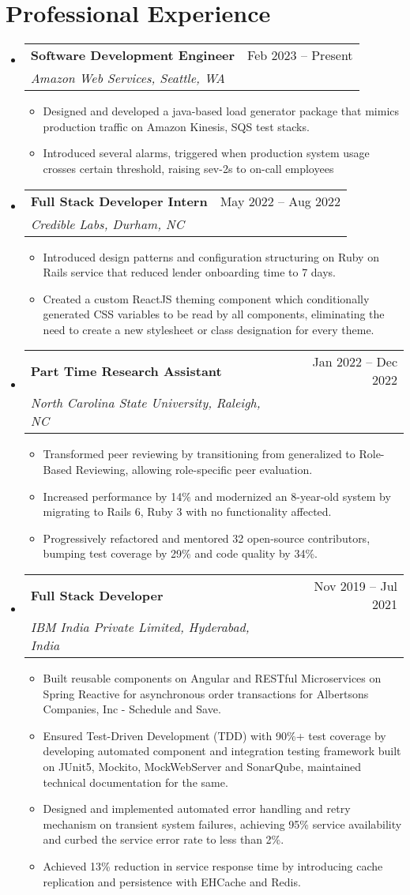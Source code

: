 \documentclass[a4paper,10pt]{article}
\makeatletter
\newcommand{\resumeItem}[1]{
  \item\small{#1}
}
\newcommand{\resumeItemListStart}{\begin{itemize}[rightmargin=0.11in]}
\newcommand{\resumeItemListEnd}{\end{itemize}}
\newcommand{\resumeQuadHeading}[4]{
  \item
  \begin{tabular*}{0.96\textwidth}[t]{l@{\extracolsep{\fill}}r}
    \textbf{#1} & #2 \\
    \textit{\small#3} & \textit{\small #4} \\
  \end{tabular*}
}
\newcommand{\resumeHeadingListStart}{
  \begin{itemize}[leftmargin=0.15in, label={}]
}
\newcommand{\resumeHeadingListEnd}{\end{itemize}}
\makeatother
\begin{document}
\section{Professional Experience}
\resumeHeadingListStart{}

  \resumeQuadHeading{Software Development Engineer}{Feb 2023 -- Present}
  {Amazon Web Services, Seattle, WA}{}
    \resumeItemListStart{}
      \resumeItem{Designed and developed a java-based load generator package that mimics production traffic on Amazon Kinesis, SQS test stacks.}
      \resumeItem{Introduced several alarms, triggered when production system usage crosses certain threshold, raising sev-2s to on-call employees}
    \resumeItemListEnd{}
  
    \resumeQuadHeading{Full Stack Developer Intern}{May 2022 -- Aug 2022}
    {Credible Labs, Durham, NC}{}
      \resumeItemListStart{}
        \resumeItem{Introduced design patterns and configuration structuring on Ruby on Rails service that reduced lender onboarding time to 7 days.}
        \resumeItem{Created a custom ReactJS theming component which conditionally generated CSS variables to be read by all components, eliminating
        the need to create a new stylesheet or class designation for every theme.}
      \resumeItemListEnd{}

    \resumeQuadHeading{Part Time Research Assistant}{Jan 2022 -- Dec 2022}
    {North Carolina State University, Raleigh, NC}{}
      \resumeItemListStart{}
        \resumeItem{Transformed peer reviewing by transitioning from generalized to Role-Based Reviewing, allowing role-specific peer evaluation.}
        \resumeItem{Increased performance by 14\% and modernized an 8-year-old system by migrating to Rails 6, Ruby 3 with no functionality affected.}
        \resumeItem{Progressively refactored and mentored 32 open-source contributors, bumping test coverage by 29\% and code quality by 34\%.}
      \resumeItemListEnd{}

  \resumeQuadHeading{Full Stack Developer}{Nov 2019 -- Jul 2021}
  {IBM India Private Limited, Hyderabad, India}{}
    \resumeItemListStart{}
      \resumeItem{Built reusable components on Angular and RESTful Microservices on Spring Reactive for asynchronous order transactions for Albertsons Companies, Inc - Schedule and Save.}
      \resumeItem{Ensured Test-Driven Development (TDD) with 90\%+ test coverage by developing automated component and integration testing
      framework built on JUnit5, Mockito, MockWebServer and SonarQube, maintained technical documentation for the same.}
      \resumeItem{Designed and implemented automated error handling and retry mechanism on transient system failures, achieving 95\% service
      availability and curbed the service error rate to less than 2\%.}
      \resumeItem{Achieved 13\% reduction in service response time by introducing cache replication and persistence with EHCache and Redis.}
      \resumeItemListEnd{}
\resumeHeadingListEnd{}
\end{document}

